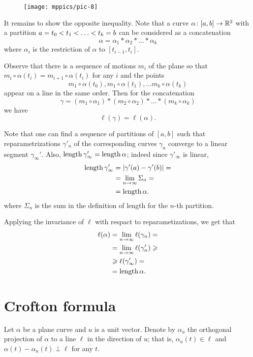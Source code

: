 \begin{wrapfigure}{r}{36 mm}
\vskip-4mm
\centering
\texttt{[image: mppics/pic-8]}
\end{wrapfigure}

It remains to show the opposite inequality.
Note that a curve $\alpha\colon[a,b]\to \mathbb{R}^2$ with a partition $a=t_0\z<t_1\z<\z\dots\z<t_k=b$ can be considered as a concatenation
\[\alpha=\alpha_1*\alpha_2*\dots*\alpha_k\]
where $\alpha_i$ is the restriction of $\alpha$ to $[t_{i-1},t_i]$.

Observe that there is a sequence of motions $m_i$ of the plane so that $m_i\circ\alpha(t_i)=m_{i+1}\circ\alpha(t_i)$ for any $i$ and 
the points 
\[m_1\circ\alpha(t_0), m_1\circ\alpha(t_1),\dots m_k\circ\alpha(t_k)\] 
appear on a line in the same order.
Then for the concatenation 
\[\gamma=(m_1\circ\alpha_1)*(m_2\circ\alpha_2)*\dots*(m_k\circ\alpha_k)\]
we have
\[\ell(\gamma)=\ell(\alpha).\]

Note that one can find a sequence of partitions of $[a,b]$ such that reparametrizations $\gamma'_n$ of 
the corresponding curves $\gamma_n$ converge to a linear segment $\gamma_\infty'$. 
Also, $\mathop{\rm length}\nolimits\gamma'_\infty=\mathop{\rm length}\nolimits\alpha$;
indeed since $\gamma'_\infty$ is linear,
\begin{align*}
\mathop{\rm length}\nolimits \gamma'_\infty&=|\gamma'(a)-\gamma'(b)|=
\\
&=\lim_{n\to\infty}\Sigma_n=
\\
&=\mathop{\rm length}\nolimits\alpha.
\end{align*}
where $\Sigma_n$ is the sum in the definition of length for the $n$-th partition.

Applying the invariance of $\ell$ with respact to reparametizations, we get that
\begin{align*}
\ell(\alpha)&=\lim_{n\to\infty}\ell(\gamma_n)=
\\
&=\lim_{n\to\infty}\ell(\gamma_n')\geqslant
\\
&\geqslant \ell(\gamma_\infty')=
\\
&=\mathop{\rm length}\nolimits\alpha.
\end{align*}
\qedsf




\section{Crofton formula}

Let $\alpha$ be a plane curve and $u$ is a unit vector.
Denote by $\alpha_u$ the orthogonal projection of $\alpha$ to a line $\ell$ in the direction of $u$;
that is, $\alpha_u(t)\in\ell$ and $\alpha(t)-\alpha_u(t)\perp \ell$ for any $t$.

